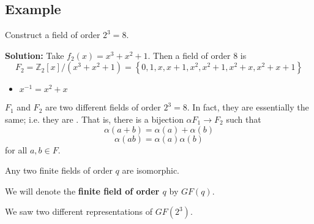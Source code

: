 \begin{exbox}
    \subsection{Example}
    Construct a field of order $ 2^3=8 $.

    \textbf{Solution:} Take $ f_2(x)=x^3+x^2+1 $. Then a field of order $ 8 $ is
    \[ F_2=\mathbb{Z}_2[x]/(x^3+x^2+1)=\left\{ 0,1,x,x+1,x^2,x^2+1,x^2+x,x^2+x+1\right\} \]
    \begin{itemize}
        \item $ x^{-1}=x^2+x $
    \end{itemize}
\end{exbox}

 $ F_1 $ and $ F_2 $ are two different fields of order $ 2^3=8 $.
In fact, they are essentially the same; i.e. they are . That is,
there is a bijection $ \alpha F_1\rightarrow F_2 $ such that
\[ \alpha(a+b)=\alpha(a)+\alpha(b) \]
\[ \alpha(ab)=\alpha(a)\alpha(b) \]
for all $ a,b\in F $.

\begin{thmbox}
    \begin{theorem}
    Any two finite fields of order $ q $ are isomorphic.
\end{theorem} \end{thmbox}

\begin{defbox}
    \begin{definition}
    We will denote the \textbf{finite field of order $ q $} by $ GF(q) $.
\end{definition} \end{defbox}
We saw two different representations of $ GF(2^3) $.